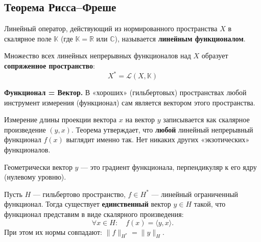
\subsection{Теорема Рисса--Фреше}

\begin{definition}
	Линейный оператор, действующий из нормированного пространства $X$ в скалярное поле $\mathbb{K}$ (где $\mathbb{K} = \mathbb{R}$ или $\mathbb{C}$), называется \textbf{линейным функционалом}.
	
	Множество всех линейных непрерывных функционалов над $X$ образует \textbf{сопряженное пространство}:
	\[ X^* = \mathcal{L}(X, \mathbb{K}) \]
\end{definition}

\begin{idea}
	\textbf{Функционал = Вектор.}
	В «хороших» (гильбертовых) пространствах любой инструмент измерения (функционал) сам является вектором этого пространства.
	
	Измерение длины проекции вектора $x$ на вектор $y$ записывается как скалярное произведение $(y, x)$. Теорема утверждает, что \textbf{любой} линейный непрерывный функционал $f(x)$ выглядит именно так. Нет никаких других «экзотических» функционалов.
	
	Геометрически вектор $y$ — это градиент функционала, перпендикуляр к его ядру (нулевому уровню).
\end{idea}



\begin{theorem}\label{Riss-Freshe}
	Пусть $H$ — гильбертово пространство, $f \in H^*$ — линейный ограниченный функционал.
	Тогда существует \textbf{единственный} вектор $y \in H$ такой, что функционал представим в виде скалярного произведения:
	\[ \forall x \in H: \quad f(x) = \langle y, x \rangle. \]
	При этом их нормы совпадают: $\|f\|_{H^*} = \|y\|_H$.
\end{theorem}

